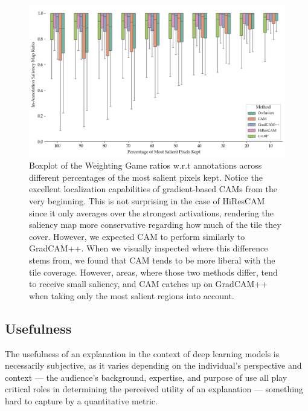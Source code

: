\begin{figure}
    \begin{center}
    \begin{minipage}{1\textwidth}
      \includegraphics[width=\textwidth]{img/weighting-game-boxplot.png}
    \end{minipage}
    \caption{Boxplot of the Weighting Game ratios w.r.t annotations across different percentages of the most salient pixels kept. Notice the excellent localization capabilities of gradient-based CAMs from the very beginning. This is not surprising in the case of HiResCAM since it only averages over the strongest activations, rendering the saliency map more conservative regarding how much of the tile they cover. However, we expected CAM to perform similarly to GradCAM++. When we visually inspected where this difference stems from, we found that CAM tends to be more liberal with the tile coverage. However, areas, where those two methods differ, tend to receive small saliency, and CAM catches up on GradCAM++ when taking only the most salient regions into account.}
    \label{fig:weighting-game-boxplot}
    \end{center}
\end{figure}

\subsection*{Usefulness}

The usefulness of an explanation in the context of deep learning models is necessarily subjective, as it varies depending on the individual's perspective and context --- the audience's background, expertise, and purpose of use all play critical roles in determining the perceived utility of an explanation \cite{xai-doshi} --- something hard to capture by a quantitative metric.

